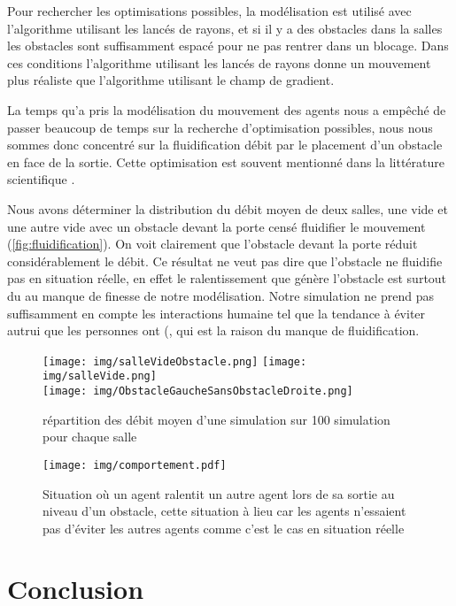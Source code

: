 \documentclass{article}
\begin{document}
Pour rechercher les optimisations possibles, la modélisation
est utilisé avec l'algorithme utilisant les lancés de rayons,
et si il y a des obstacles dans la salles les obstacles sont
suffisamment espacé pour ne pas rentrer dans un blocage. Dans
ces conditions l'algorithme utilisant les lancés de rayons
donne un mouvement plus réaliste que l'algorithme utilisant
le champ de gradient.

La temps qu'a pris la modélisation du mouvement des agents
nous a empêché de passer beaucoup de temps sur la recherche
d'optimisation possibles, nous nous sommes donc concentré
sur la fluidification débit par le placement d'un obstacle
en face de la sortie. Cette optimisation est souvent
 mentionné dans la littérature scientifique \cite{Theos94}.

Nous avons déterminer la distribution du débit moyen de
deux salles, une vide et une autre vide avec un obstacle
devant la porte censé fluidifier le mouvement
(\autoref{fig:fluidification}). On voit clairement
que l'obstacle devant la porte réduit considérablement
le débit. Ce résultat ne veut pas dire que l'obstacle ne
fluidifie pas en situation réelle, en effet le ralentissement
que génère l'obstacle est surtout du au manque de finesse de notre
modélisation. Notre simulation ne prend pas suffisamment en compte
les interactions humaine tel que la tendance à éviter
autrui que les personnes ont (, qui est la raison du manque de
fluidification.

\begin{figure}[h]
  \centering
  \texttt{[image: img/salleVideObstacle.png]}
  \texttt{[image: img/salleVide.png]} \\
  \texttt{[image: img/ObstacleGaucheSansObstacleDroite.png]}
  \caption{répartition des débit moyen d'une simulation sur 100 simulation
    pour chaque salle}
  \label{fig:fluidification}
\end{figure}

\begin{figure}[h]
  \centering
  \texttt{[image: img/comportement.pdf]}
  \caption{Situation où un agent ralentit un autre agent lors
    de sa sortie au niveau d'un obstacle, cette situation à lieu
    car les agents n'essaient pas d'éviter les autres agents comme
    c'est le cas en situation réelle}
\end{figure}

\section{Conclusion}
\end{document}
